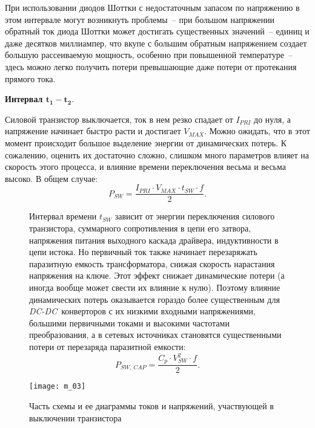 При использовании диодов Шоттки с недостаточным запасом по напряжению в этом
интервале могут возникнуть проблемы~-- при большом напряжении обратный ток диода
Шоттки может достигать существенных значений~-- единиц и даже десятков
миллиампер, что вкупе с большим обратным напряжением создает большую
рассеиваемую мощность, особенно при повышенной температуре~-- здесь можно легко
получить потери превышающие даже потери от протекания прямого тока.

\textbf{Интервал \( \bm{t_1 - t_2} \)}.

Силовой транзистор выключается, ток в нем резко спадает от \( I_{PRI} \) до
нуля, а напряжение начинает быстро расти и достигает \( V_{MAX} \). Можно
ожидать, что в этот момент происходит большое выделение энергии от динамических
потерь. К сожалению, оценить их достаточно сложно, слишком много параметров
влияет на скорость этого процесса, и влияние времени переключения весьма и
весьма высоко. В общем случае:
\begin{equation}
	P_{SW} = \frac{I_{PRI}\cdot V_{MAX}\cdot t_{SW}\cdot f}{2}.
\end{equation}
		
\begin{figure}[h!]
	\begin{minipage}{.5\textwidth}
		Интервал времени \( t_{SW} \) зависит от энергии переключения силового
		транзистора, суммарного сопротивления в цепи его затвора, напряжения
		питания выходного каскада драйвера, индуктивности в цепи истока. Но
		первичный ток также начинает перезаряжать паразитную емкость
		трансформатора, снижая скорость нарастания напряжения на ключе. Этот
		эффект снижает динамические потери (а иногда вообще может свести их
		влияние к нулю). Поэтому влияние динамических потерь оказывается
		гораздо более существенным для \emph{DC-DC}~конверторов с их низкими
		входными напряжениями, большими первичными токами и высокими частотами
		преобразования, а в сетевых источниках становятся существенными потери
		от перезаряда паразитной емкости:
		\begin{equation}
			P_{SW,\,CAP} = \frac{C_p\cdot V_{SW}^2\cdot f}{2}.
		\end{equation}
	\end{minipage} \hfill
	\begin{minipage}{.45\textwidth}
		\texttt{[image: m\_03]}
		\parbox{\textwidth}{\caption{Часть схемы и ее диаграммы токов и
		напряжений, участвующей в выключении транзистора}\label{p03}}
	\end{minipage}
\end{figure}

